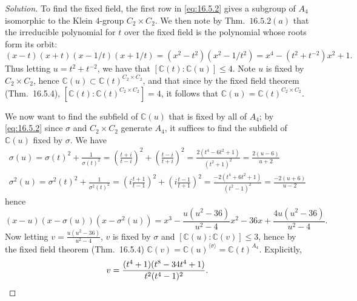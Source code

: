 \documentclass[12pt]{article}
\theoremstyle{remark}
\begin{document}
\begin{proof}[Solution]
  \par To find the fixed field, the first row in \eqref{eq:16.5.2} gives a subgroup of $A_4$ isomorphic to the Klein $4$-group $C_2 \times C_2$. We then note by Thm.~$16.5.2(a)$ that the irreducible polynomial for $t$ over the fixed field is the polynomial whose roots form its orbit:
  \begin{equation*}
    (x-t)(x+t)(x-1/t)(x+1/t) = (x^2 - t^2)(x^2 - 1/t^2) = x^4 - (t^2 + t^{-2})x^2 + 1.
  \end{equation*}
  Thus letting $u = t^2 + t^{-2}$, we have that $[\mathbb{C}(t) : \mathbb{C}(u)] \le 4$. Note $u$ is fixed by $C_2 \times C_2$, hence $\mathbb{C}(u) \subset \mathbb{C}(t)^{C_2 \times C_2}$, and that since by the fixed field theorem (Thm.~16.5.4), $[\mathbb{C}(t) : \mathbb{C}(t)^{C_2 \times C_2}] = 4$, it follows that $\mathbb{C}(u) = \mathbb{C}(t)^{C_2 \times C_2}$.
  \par We now want to find the subfield of $\mathbb{C}(u)$ that is fixed by all of $A_4$; by \eqref{eq:16.5.2} since $\sigma$ and $C_2 \times C_2$ generate $A_4$, it suffices to find the subfield of $\mathbb{C}(u)$ fixed by $\sigma$. We have
  \begin{gather*}
    \sigma(u) = \sigma(t)^2 + \frac{1}{\sigma(t)^{2}} = \left(\frac{t+i}{t - i}\right)^2 + \left(\frac{t-i}{t+i}\right)^2 = \frac{2(t^4 - 6t^2 + 1)}{(t^2 + 1)^2} = \frac{2(u-6)}{u+2}\\
    \sigma^2(u) = \sigma^2(t)^2 + \frac{1}{\sigma^2(t)^{2}} = \left(i\frac{t+1}{t-1}\right)^2 + \left(i \frac{t-1}{t+1}\right)^2 = \frac{-2(t^4 + 6t^2 + 1)}{(t^2 - 1)^2} = \frac{-2(u+6)}{u - 2}
  \end{gather*}
  hence
  \begin{equation*}
    (x - u)(x - \sigma(u))(x - \sigma^2(u)) = x^3 - \frac{u(u^2 - 36)}{u^2 - 4}x^2 - 36x + \frac{4u(u^2 - 36)}{u^2 - 4}.
  \end{equation*}
  Now letting $v = \frac{u(u^2 - 36)}{u^2 - 4}$, $v$ is fixed by $\sigma$ and $[\mathbb{C}(u) : \mathbb{C}(v)] \le 3$, hence by the fixed field theorem (Thm.~16.5.4) $\mathbb{C}(v) = \mathbb{C}(u)^{\langle \sigma\rangle} = \mathbb{C}(t)^{A_4}$. Explicitly,
  \begin{equation*}
    v = \frac{(t^4 + 1)(t^8 - 34t^4 + 1)}{t^2(t^4 - 1)^2}.\qedhere
  \end{equation*}
\end{proof}
\end{document}
